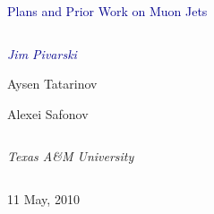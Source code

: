 \documentclass[compress]{beamer}
\begin{document}
\begin{frame}
\vfill
\begin{center}
\textcolor{darkblue}{\Large Plans and Prior Work on Muon Jets}

\vfill
\begin{columns}
\begin{center}
\large
\textcolor{darkblue}{\it Jim Pivarski}

Aysen Tatarinov

Alexei Safonov
\end{center}
\end{columns}

\begin{columns}
\begin{center}
\scriptsize
{\it Texas A\&M University}
\end{center}
\end{columns}

\vfill
11 May, 2010

\end{center}
\end{frame}


\small
\end{document}
